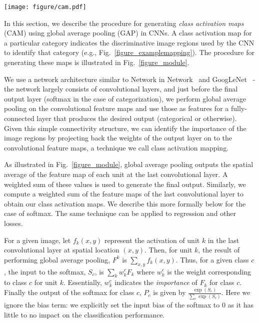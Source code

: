 \documentclass[10pt,twocolumn,letterpaper]{article}
\begin{document}
\begin{figure*}
\texttt{[image: figure/cam.pdf]}
 \caption{Class Activation Mapping: the predicted class score is mapped back to the previous convolutional layer to generate the class activation maps (CAMs). The CAM highlights the class-specific discriminative regions.}\label{figure_module}
\end{figure*}

In this section, we describe the procedure for generating \textit{class activation maps} (CAM) using global average pooling (GAP) in CNNs. A class activation map for a particular category indicates the discriminative image regions used by the CNN to identify that category (e.g., Fig.~\ref{figure_examplemapping}). The procedure for generating these maps is illustrated in Fig.~\ref{figure_module}.

We use a network architecture similar to Network in Network~\cite{lin2013network} and GoogLeNet~\cite{szegedy2014going} - the network largely consists of convolutional layers, and just before the final output layer (softmax in the case of categorization), we perform global average pooling on the convolutional feature maps and use those as features for a fully-connected layer that produces the desired output (categorical or otherwise). Given this simple connectivity structure, we can identify the importance of the image regions by projecting back the weights of the output layer on to the convolutional feature maps, a technique we call class activation mapping.



As illustrated in Fig.~\ref{figure_module}, global average pooling outputs the spatial average of the feature map of each unit at the last convolutional layer. A weighted sum of these values is used to generate the final output. Similarly, we  compute a weighted sum of the feature maps of the last convolutional layer to obtain our class activation maps. We describe this more formally below for the case of softmax. The same technique can be applied to regression and other losses.



For a given image, let $f_{k}(x,y)$ represent the activation of unit $k$ in the last convolutional layer at spatial location $(x, y)$. Then, for unit $k$, the result of performing global average pooling, $F^{k}$ is $\sum_{x,y}f_{k}(x,y)$. Thus, for a given class $c$, the input to the softmax, $S_c$, is $\sum_{k}w^{c}_{k}F_{k}$ where $w^{c}_{k}$ is the weight corresponding to class $c$ for unit $k$. Essentially, $w^{c}_{k}$ indicates the \textit{importance} of $F_{k}$ for class $c$. Finally the output of the softmax for class $c$, $P_c$ is given by $\frac{\exp(S_c)}{\sum_{c}\exp(S_c)}$. Here we ignore the bias term: we explicitly set the input bias of the softmax to $0$ as it has little to no impact on the classification performance.
\end{document}
